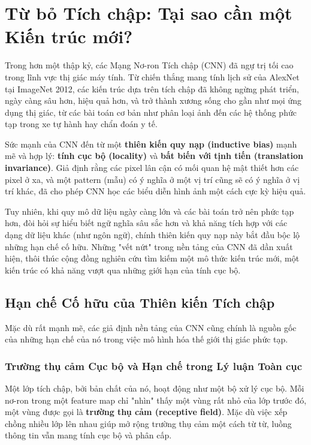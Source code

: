 \section{Từ bỏ Tích chập: Tại sao cần một Kiến trúc mới?}
\label{sec:moving_beyond_convolution}

Trong hơn một thập kỷ, các Mạng Nơ-ron Tích chập (CNN) đã ngự trị tối cao trong lĩnh vực thị giác máy tính. Từ chiến thắng mang tính lịch sử của AlexNet tại ImageNet 2012, các kiến trúc dựa trên tích chập đã không ngừng phát triển, ngày càng sâu hơn, hiệu quả hơn, và trở thành xương sống cho gần như mọi ứng dụng thị giác, từ các bài toán cơ bản như phân loại ảnh đến các hệ thống phức tạp trong xe tự hành hay chẩn đoán y tế.

Sức mạnh của CNN đến từ một \textbf{thiên kiến quy nạp (inductive bias)} mạnh mẽ và hợp lý: \textbf{tính cục bộ (locality)} và \textbf{bất biến với tịnh tiến (translation invariance)}. Giả định rằng các pixel lân cận có mối quan hệ mật thiết hơn các pixel ở xa, và một pattern (mẫu) có ý nghĩa ở một vị trí cũng sẽ có ý nghĩa ở vị trí khác, đã cho phép CNN học các biểu diễn hình ảnh một cách cực kỳ hiệu quả.

Tuy nhiên, khi quy mô dữ liệu ngày càng lớn và các bài toán trở nên phức tạp hơn, đòi hỏi sự hiểu biết ngữ nghĩa sâu sắc hơn và khả năng tích hợp với các dạng dữ liệu khác (như ngôn ngữ), chính thiên kiến quy nạp này bắt đầu bộc lộ những hạn chế cố hữu. Những "vết nứt" trong nền tảng của CNN đã dần xuất hiện, thôi thúc cộng đồng nghiên cứu tìm kiếm một mô thức kiến trúc mới, một kiến trúc có khả năng vượt qua những giới hạn của tính cục bộ.

\subsection{Hạn chế Cố hữu của Thiên kiến Tích chập}
\label{subsec:cnn_inductive_bias_limitations}
Mặc dù rất mạnh mẽ, các giả định nền tảng của CNN cũng chính là nguồn gốc của những hạn chế của nó trong việc mô hình hóa thế giới thị giác phức tạp.

\subsubsection{Trường thụ cảm Cục bộ và Hạn chế trong Lý luận Toàn cục}
\label{subsubsec:local_receptive_field}
Một lớp tích chập, bởi bản chất của nó, hoạt động như một bộ xử lý cục bộ. Mỗi nơ-ron trong một feature map chỉ "nhìn" thấy một vùng rất nhỏ của lớp trước đó, một vùng được gọi là \textbf{trường thụ cảm (receptive field)}. Mặc dù việc xếp chồng nhiều lớp lên nhau giúp mở rộng trường thụ cảm một cách từ từ, luồng thông tin vẫn mang tính cục bộ và phân cấp.

